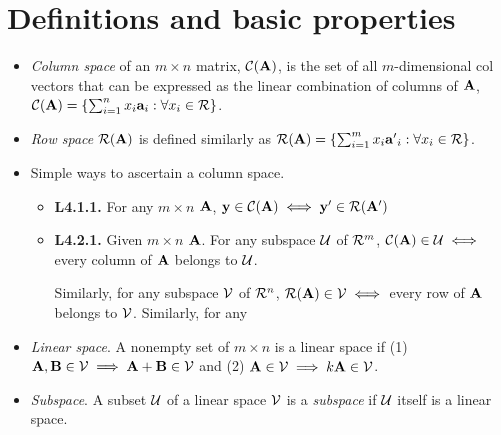 \documentclass[a4paper, oneside]{book}
\begin{document}
\section{Definitions and basic properties}
\begin{itemize}
\item \textit{Column space} of an $m\times n$ matrix, $\mathcal{C}(\mathbf A) $, is the set of all $m$-dimensional col vectors that can be expressed as the linear combination of columns of $\mathbf A$, \ie $\mathcal{C}(\mathbf A) = \left\{\sum_{i=1}^n x_i\mathbf{a}_i : \forall x_i \in \mathcal{R} \right\}$.
\item \textit{Row space} $\mathcal{R}(\mathbf A) $ is defined similarly as $\mathcal{R}(\mathbf A) = \left\{\sum_{i=1}^m x_i\mathbf{a'}_i : \forall x_i \in \mathcal{R} \right\}$.
\item Simple ways to ascertain a column space.
	\begin{itemize}
	\item \textbf{L4.1.1.} For any $m\times n$ $\mathbf A$, $\mathbf y \in \mathcal C (\mathbf A) \iff \mathbf y' \in \mathcal R(\mathbf A')$
	\item \textbf{L4.2.1.} Given $m\times n$ $\mathbf A$. For any subspace $\mathcal U$ of $\mathcal R^m$, $\mathcal C(\mathbf A) \in \mathcal U \iff $ every column of $\mathbf A$ belongs to $\mathcal U$. 
	
	Similarly, for any subspace $\mathcal V$ of $\mathcal R^n$, $\mathcal R(\mathbf A) \in \mathcal V \iff $ every row of $\mathbf A$ belongs to $\mathcal V$. Similarly, for any
	\end{itemize}
\item \textit{Linear space}. A nonempty set of $m\times n$ is a linear space if (1) $\mathbf{A,B} \in \mathcal{V} \implies \mathbf {A+B} \in \mathcal V$ and (2) $\mathbf A \in \mathcal V \implies k\mathbf A \in \mathcal V$.
\item \textit{Subspace}. A subset $\mathcal U$ of a linear space $\mathcal V$ is a \textit{subspace} if $\mathcal U$ itself is a linear space. 


\end{itemize}
\end{document}
